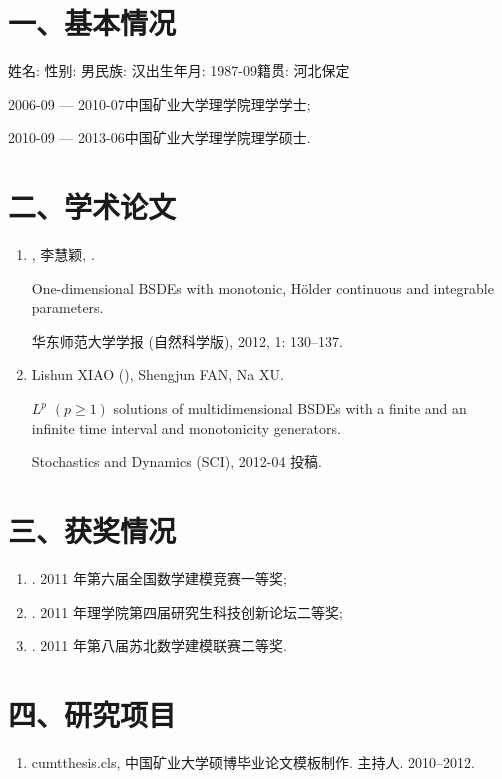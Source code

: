 \begin{resume}

\section*{一、基本情况}


姓名: \zuozhe\quad 性别: 男\quad 民族: 汉\quad 出生年月: 1987-09\quad 籍贯: 河北保定

2006-09 --- 2010-07\quad  中国矿业大学理学院理学学士;

2010-09 --- 2013-06\quad  中国矿业大学理学院理学硕士.

\section*{二、学术论文}

\begin{enumerate}
  \item \zuozhe, 李慧颖, \daoshi.

       \newblock One-dimensional BSDEs with monotonic, H\"older continuous
                 and integrable parameters.

       \newblock 华东师范大学学报 (自然科学版), 2012, 1: 130--137.
  \item Lishun XIAO (\zuozhe), Shengjun FAN, Na XU.

       \newblock $L^p$ $(p\geq 1)$ solutions of multidimensional BSDEs with a
                 finite and an infinite time interval and monotonicity
                 generators.

       \newblock Stochastics and Dynamics (SCI), 2012-04 投稿.
\end{enumerate}


\section*{三、获奖情况}
\begin{enumerate}
  \item \zuozhe. 2011 年第六届全国数学建模竞赛一等奖;
  \item \zuozhe. 2011 年理学院第四届研究生科技创新论坛二等奖;
  \item \zuozhe. 2011 年第八届苏北数学建模联赛二等奖.
\end{enumerate}
\section*{四、研究项目}
\begin{enumerate}
  \item cumtthesis.cls, 中国矿业大学硕博毕业论文模板制作. 主持人. 2010--2012.
\end{enumerate}

\end{resume}